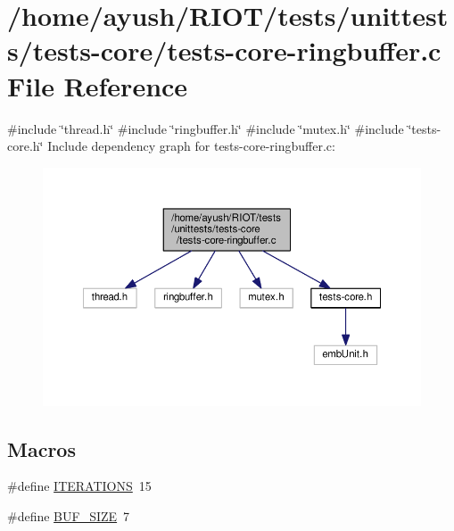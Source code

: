 \hypertarget{tests-core-ringbuffer_8c}{}\section{/home/ayush/\+R\+I\+O\+T/tests/unittests/tests-\/core/tests-\/core-\/ringbuffer.c File Reference}
\label{tests-core-ringbuffer_8c}
{\ttfamily \#include \char`\"{}thread.\+h\char`\"{}}\newline
{\ttfamily \#include \char`\"{}ringbuffer.\+h\char`\"{}}\newline
{\ttfamily \#include \char`\"{}mutex.\+h\char`\"{}}\newline
{\ttfamily \#include \char`\"{}tests-\/core.\+h\char`\"{}}\newline
Include dependency graph for tests-\/core-\/ringbuffer.c\+:
\nopagebreak
\begin{figure}[H]
\begin{center}
\leavevmode
\includegraphics[width=350pt]{tests-core-ringbuffer_8c__incl}
\end{center}
\end{figure}
\subsection*{Macros}
\begin{DoxyCompactItemize}
\item 
\#define \hyperlink{tests-core-ringbuffer_8c_aa9cc087d076e4fa101f8794a947bd01a}{I\+T\+E\+R\+A\+T\+I\+O\+NS}~15
\item 
\#define \hyperlink{tests-core-ringbuffer_8c_a6821bafc3c88dfb2e433a095df9940c6}{B\+U\+F\+\_\+\+S\+I\+ZE}~7
\end{DoxyCompactItemize}
